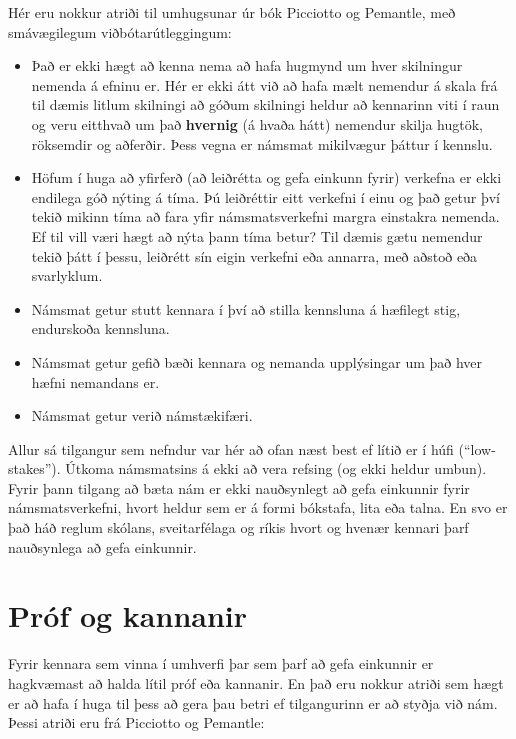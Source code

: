 \documentclass[
  icelandic,
]{book}
\providecommand{\tightlist}{%
  \setlength{\itemsep}{0pt}\setlength{\parskip}{0pt}}
\begin{document}
Hér eru nokkur atriði til umhugsunar úr bók Picciotto og Pemantle, með smávægilegum viðbótarútleggingum:

\begin{itemize}
\tightlist
\item
  Það er ekki hægt að kenna nema að hafa hugmynd um hver skilningur nemenda á efninu er. Hér er ekki átt við að hafa mælt nemendur á skala frá til dæmis litlum skilningi að góðum skilningi heldur að kennarinn viti í raun og veru eitthvað um það \textbf{hvernig} (á hvaða hátt) nemendur skilja hugtök, röksemdir og aðferðir. Þess vegna er námsmat mikilvægur þáttur í kennslu.
\item
  Höfum í huga að yfirferð (að leiðrétta og gefa einkunn fyrir) verkefna er ekki endilega góð nýting á tíma. Þú leiðréttir eitt verkefni í einu og það getur því tekið mikinn tíma að fara yfir námsmatsverkefni margra einstakra nemenda. Ef til vill væri hægt að nýta þann tíma betur? Til dæmis gætu nemendur tekið þátt í þessu, leiðrétt sín eigin verkefni eða annarra, með aðstoð eða svarlyklum.
\item
  Námsmat getur stutt kennara í því að stilla kennsluna á hæfilegt stig, endurskoða kennsluna.
\item
  Námsmat getur gefið bæði kennara og nemanda upplýsingar um það hver hæfni nemandans er.
\item
  Námsmat getur verið námstækifæri.
\end{itemize}

Allur sá tilgangur sem nefndur var hér að ofan næst best ef lítið er í húfi (``low-stakes''). Útkoma námsmatsins á ekki að vera refsing (og ekki heldur umbun). Fyrir þann tilgang að bæta nám er ekki nauðsynlegt að gefa einkunnir fyrir námsmatsverkefni, hvort heldur sem er á formi bókstafa, lita eða talna. En svo er það háð reglum skólans, sveitarfélaga og ríkis hvort og hvenær kennari þarf nauðsynlega að gefa einkunnir.

\section{Próf og kannanir}\label{pruxf3f-og-kannanir}

Fyrir kennara sem vinna í umhverfi þar sem þarf að gefa einkunnir er hagkvæmast að halda lítil próf eða kannanir. En það eru nokkur atriði sem hægt er að hafa í huga til þess að gera þau betri ef tilgangurinn er að styðja við nám. Þessi atriði eru frá Picciotto og Pemantle:
\end{document}
